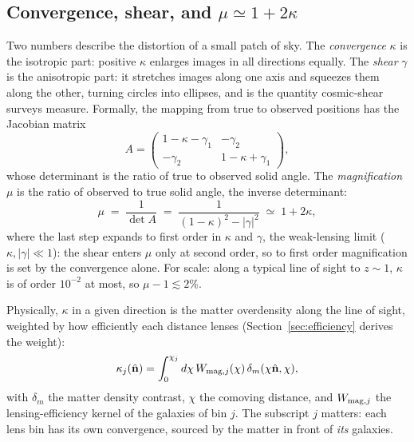 \documentclass[11pt]{article}
\begin{document}
\subsection{Convergence, shear, and $\mu \simeq 1 + 2\kappa$}
\label{sec:kappa}

Two numbers describe the distortion of a small patch of sky.  The
\emph{convergence} $\kappa$ is the isotropic part: positive $\kappa$
enlarges images in all directions equally.  The \emph{shear} $\gamma$
is the anisotropic part: it stretches images along one axis and
squeezes them along the other, turning circles into ellipses, and is
the quantity cosmic-shear surveys measure.  Formally, the mapping
from true to observed positions has the Jacobian matrix
\begin{equation}
  A =
  \begin{pmatrix}
    1 - \kappa - \gamma_1 & -\gamma_2 \\
    -\gamma_2 & 1 - \kappa + \gamma_1
  \end{pmatrix},
\end{equation}
whose determinant is the ratio of true to observed solid angle.  The
\emph{magnification} $\mu$ is the ratio of observed to true solid
angle, the inverse determinant:
\begin{equation}
  \mu \;=\; \frac{1}{\det A}
       \;=\; \frac{1}{(1-\kappa)^2 - |\gamma|^2}
       \;\simeq\; 1 + 2\kappa ,
  \label{eq:mu}
\end{equation}
where the last step expands to first order in $\kappa$ and $\gamma$,
the weak-lensing limit ($\kappa, |\gamma| \ll 1$): the shear enters
$\mu$ only at second order, so to first order magnification is set by
the convergence alone.  For scale: along a typical line of sight to
$z \sim 1$, $\kappa$ is of order $10^{-2}$ at most, so
$\mu - 1 \lesssim 2\%$.

Physically, $\kappa$ in a given direction is the matter overdensity
along the line of sight, weighted by how efficiently each distance
lenses (Section~\ref{sec:efficiency} derives the weight):
\begin{equation}
  \kappa_j(\hat{\mathbf n})
  = \int_0^{\chi_j} d\chi\, W_{{\rm mag},j}(\chi)\,
    \delta_m(\chi\hat{\mathbf n}, \chi),
  \label{eq:kappadef}
\end{equation}
with $\delta_m$ the matter density contrast, $\chi$ the comoving
distance, and $W_{{\rm mag},j}$ the lensing-efficiency kernel of the
galaxies of bin $j$.  The subscript $j$ matters: each lens bin has
its own convergence, sourced by the matter in front of \emph{its}
galaxies.
\end{document}
